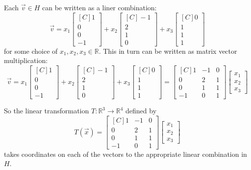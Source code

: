 \begin{example}
Each $\vec{v} \in H$ can be written as a liner combination:
\[
\vec{v}=
x_1\begin{bmatrix*}[C]1 \\ 0 \\ 0 \\ -1\end{bmatrix*}+
x_2\begin{bmatrix*}[C]-1 \\ 2 \\ 1 \\ 0\end{bmatrix*}+
x_3\begin{bmatrix*}[C]0 \\ 1 \\ 1 \\ 1\end{bmatrix*}
\]
for some choice of $x_1, x_2, x_3 \in \mathbb{R}$. This in turn can be written
as matrix vector multiplication:
\[
\vec{v}=
x_1\begin{bmatrix*}[C]1 \\ 0 \\ 0 \\ -1\end{bmatrix*}+
x_2\begin{bmatrix*}[C]-1 \\ 2 \\ 1 \\ 0\end{bmatrix*}+
x_3\begin{bmatrix*}[C]0 \\ 1 \\ 1 \\ 1\end{bmatrix*}
=
\begin{bmatrix*}[C]
1 & -1 & 0 \\
0 & 2 & 1 \\
0 & 1 & 1 \\
-1 & 0 & 1 
\end{bmatrix*}
\begin{bmatrix}
x_1 \\ x_2 \\ x_3
\end{bmatrix}
\]

So the linear transformation $T:\mathbb{R}^3 \to \mathbb{R}^4$ defined by 
\[
T(\vec{x})=\begin{bmatrix*}[C]
1 & -1 & 0 \\
0 & 2 & 1 \\
0 & 1 & 1 \\
-1 & 0 & 1 
\end{bmatrix*}
\begin{bmatrix}x_1 \\ x_2 \\ x_3 \end{bmatrix}
\]
takes coordinates on each of the vectors to the appropriate linear combination in $H$.
\end{example}
